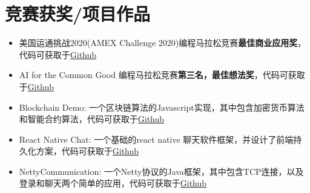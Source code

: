 \documentclass{resume}
\begin{document}


\section{竞赛获奖/项目作品}
\begin{itemize}[parsep=0.2ex]
  \item 美国运通挑战2020(AMEX Challenge 2020)编程马拉松竞赛\textbf{最佳商业应用奖}，代码可获取于\href{https://github.com/HackADream/AMEX-shop-small}{Github}
  \item AI for the Common Good 编程马拉松竞赛\textbf{第三名，最佳想法奖}，代码可获取于\href{https://github.com/ROJHackathon/X5-FAIR-EzTalk}{Github}
  \item Blockchain Demo: 一个区块链算法的Javascript实现，其中包含加密货币算法和智能合约算法，代码可获取于\href{https://github.com/YangtaoGe518/Blockchain-Demo}{Github}
  \item React Native Chat: 一个基础的react native 聊天软件框架，并设计了前端持久化方案，代码可获取于\href{https://github.com/YangtaoGe518/react-native-chat}{Github}
  \item NettyCommunication: 一个Netty协议的Java框架，其中包含TCP连接，以及登录和聊天两个简单的应用，代码可获取于\href{https://github.com/YangtaoGe518/NettyCommunication}{Github}
\end{itemize}


%
%
\end{document}
